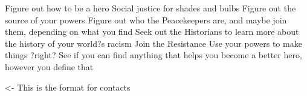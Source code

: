 \documentclass[char]{Silversiders}
\begin{document}
\name{\cMuscle{}}

Figure out how to be a hero
Social justice for shades and bulbs
Figure out the source of your powers
Figure out who the Peacekeepers are, and maybe join them, depending on what you find
Seek out the Historians to learn more about the history of your world?s racism
Join the Resistance
Use your powers to make things ?right?
See if you can find anything that helps you become a better hero, however you define that

\begin{itemz}[Goals]
	\item 
\end{itemz}

\begin{itemz}[Notes]
	\item 
\end{itemz}

\begin{contacts}
	\contact{\cTest{}} <- This is the format for contacts 
\end{contacts}
\end{document}
